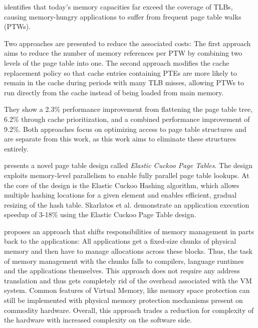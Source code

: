 \textbf{\cite{park2022every}} identifies that today’s memory capacities far exceed the coverage of TLBs, causing memory-hungry applications to suffer from frequent page table walks (PTWs).

Two approaches are presented to reduce the associated costs: The first approach aims to reduce the number of memory references per PTW by combining two levels of the page table into one. The second approach modifies the cache replacement policy so that cache entries containing PTEs are more likely to remain in the cache during periods with many TLB misses, allowing PTWs to run directly from the cache instead of being loaded from main memory.

They show a 2.3\% performance improvement from flattening the page table tree, 6.2\% through cache prioritization, and a combined performance improvement of 9.2\%. Both approaches focus on optimizing access to page table structures and are separate from this work, as this work aims to eliminate these structures entirely.



\textbf{\cite{skarlatos2020elastic}} presents a novel page table design called \textit{Elastic Cuckoo Page Tables}. The design exploits memory-level parallelism to enable fully parallel page table lookups. At the core of the design is the Elastic Cuckoo Hashing algorithm, which allows multiple hashing locations for a given element and enables efficient, gradual resizing of the hash table. Skarlatos et al. demonstrate an application execution speedup of 3-18\% using the Elastic Cuckoo Page Table design.




\cite{zagieboylo2020cost} proposes an approach that shifts responsibilities of memory management in
parts back to the applications: All applications get a fixed-size chunks of physical memory and then have to manage allocations across these blocks.
Thus, the task of memory management with the chunks falls to compilers, language runtimes and the applications themselves.
This approach does not require any address translation and thus gets completely rid of the overhead associated with the VM system.
Common features of Virtual Memory, like memory space protection can still be implemented with physical memory protection mechanisms present on commodity hardware.
Overall, this approach trades a reduction for complexity of the hardware with increased complexity on the software side.

